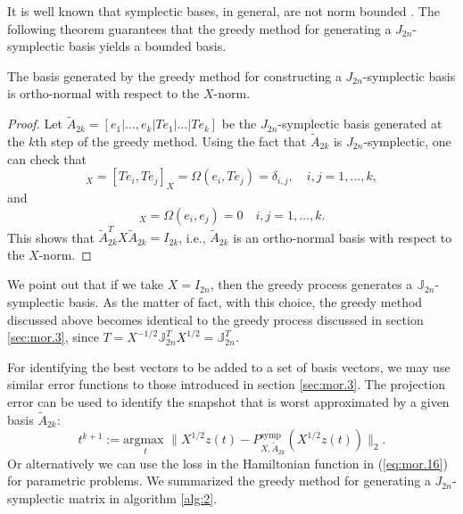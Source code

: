 It is well known that symplectic bases, in general, are not norm bounded \cite{doi:10.1137/050628519}. The following theorem guarantees that the greedy method for generating a $J_{2n}$-symplectic basis yields a bounded basis.
\begin{theorem}
The basis generated by the greedy method for constructing a $J_{2n}$-symplectic basis is ortho-normal with respect to the $X$-norm.
\end{theorem}
\begin{proof}
Let $\tilde A_{2k}=[e_1|\dots,e_k|Te_1|\dots|Te_k]$ be the $J_{2n}$-symplectic basis generated at the $k$th step of the greedy method. Using the fact that $\tilde A_{2k}$ is $J_{2n}$-symplectic, one can check that
\begin{equation}
	[e_i,e_j]_X = [Te_i,Te_j]_X = \Omega(e_i,Te_j)=\delta_{i,j}, \quad i,j=1,\dots,k,	
\end{equation}
and
\begin{equation}
	[e_i,Te_j]_X = \Omega(e_i,e_j) = 0\quad i,j=1,\dots,k.
\end{equation}
This shows that $\tilde A_{2k}^TX\tilde A_{2k} = I_{2k}$, i.e., $\tilde A_{2k}$ is an ortho-normal basis with respect to the $X$-norm.
\end{proof}
We point out that if we take $X=I_{2n}$, then the greedy process generates a $\mathbb J_{2n}$- symplectic basis. As the matter of fact, with this choice, the greedy method discussed above becomes identical to the greedy process discussed in section \ref{sec:mor.3}, since $T = X^{-1/2}\mathbb J_{2n}^TX^{1/2} = \mathbb J_{2n}^T$.

For identifying the best vectors to be added to a set of basis vectors, we may use similar error functions to those introduced in section \ref{sec:mor.3}. The projection error can be used to identify the snapshot that is worst approximated by a given basis $\tilde A_{2k}$:
\begin{equation}
	t^{k+1} := \underset{t}{\text{argmax } }\| X^{1/2}z(t) - P^\text{symp}_{X,\tilde A_{2k}}(X^{1/2}z(t)) \|_2. 
\end{equation}
Or alternatively we can use the loss in the Hamiltonian function in (\ref{eq:mor.16}) for parametric problems. We summarized the greedy method for generating a $J_{2n}$-symplectic matrix in algorithm \ref{alg:2}.

